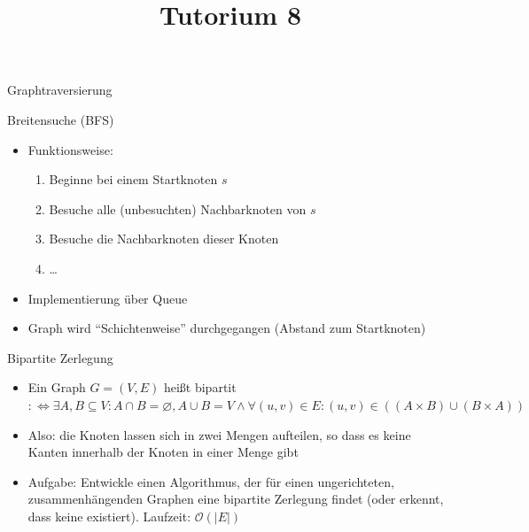 
\title[Algorithmen I SS 14]{Tutorium 8}

\usepackage{alltt}




\begin{frame}
  \maketitle
\end{frame}

\begin{frame}
	\begin{center}
		\Huge
		Graphtraversierung
	\end{center}
\end{frame}

\begin{frame}{Breitensuche (BFS)}
	\begin{itemize}
		\item Funktionsweise:
			\begin{enumerate}
				\item Beginne bei einem Startknoten $s$
				\item Besuche alle (unbesuchten) Nachbarknoten von $s$
				\item Besuche die Nachbarknoten dieser Knoten
				\item …
			\end{enumerate}
		\item Implementierung über Queue
		\item Graph wird "`Schichtenweise"' durchgegangen (Abstand zum Startknoten)
	\end{itemize}
\end{frame}

\begin{frame}{Bipartite Zerlegung}
	\begin{itemize}
		\item Ein Graph $G = (V, E)$ heißt bipartit $:\Leftrightarrow \exists A, B \subseteq V: A \cap B = \varnothing, A \cup B = V  \wedge  \forall (u, v) \in E: (u, v) \in ((A \times B) \cup (B \times A))$
		\item Also: die Knoten lassen sich in zwei Mengen aufteilen, so dass es keine Kanten innerhalb der Knoten in einer Menge gibt
		\item Aufgabe: Entwickle einen Algorithmus, der für einen ungerichteten, zusammenhängenden Graphen eine bipartite Zerlegung findet (oder erkennt, dass keine existiert). Laufzeit: $\mathcal{O}(|E|)$
	\end{itemize}
\end{frame}

